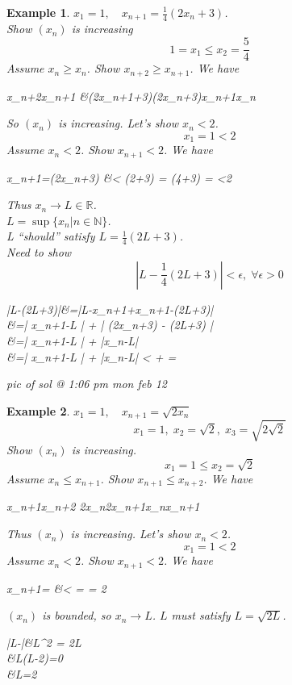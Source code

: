 \documentclass{report}
\newcommand{\N}{\mathbb{N}}  %
\newcommand{\R}{\mathbb{R}}  %
\theoremstyle{mystyle}
\newtheorem*{example}{Example}
\theoremstyle{customtheorem}
\newcommand{\ex}[1]{    \begin{example}{#1}\end{example}             }
\begin{document}
    \ex{
        $x_1=1,\quad x_{n+1}=(2x_n+3)$.\\
        Show $(x_n)$ is increasing
        \[1=x_1\leq x_2=\frac{5}{4}\]
        Assume $x_n \geq x_n$. Show $x_{n+2}\geq x_{n+1}$. We have
        \begin{flalign*}
            x_{n+2}\geq x_{n+1} &\iff \frac{1}{4}(2x_{n+1}+3)\geq \frac{1}{4}(2x_n+3)\iff x_{n+1}\geq x_n
        \end{flalign*}
        So $(x_n)$ is increasing. Let's show $x_n<2$.
        \[x_1=1<2\]
        Assume $x_n<2$. Show $x_{n+1}<2$. We have
        \begin{flalign*}
            x_{n+1}=\frac{1}{4}(2x_n+3) &< \frac{1}{4}(2\cdot 2+3) = \frac{1}{4}(4+3) = \frac{7}{4} <2
        \end{flalign*}
        Thus $x_n\rightarrow L\in \R$. \\
        $L=\sup\{x_n\vert n\in\N\}$. \\
        L ``should'' satisfy $L=\frac{1}{4}(2L+3)$.\\
        Need to show \[\left| L - \frac{1}{4}(2L+3)\right| < \epsilon,\; \forall \epsilon > 0\]
        \begin{flalign*}
            \left|L-\frac{1}{4}(2L+3)\right|&=\left|L-x_{n+1}+x_{n+1}-\frac{1}{4}(2L+3)\right|\\
            &=\left| x_{n+1}-L \right| + \left| \frac{1}{4}(2x_n+3) - \frac{1}{4}(2L+3) \right|\\
            &=\left| x_{n+1}-L \right| + \frac{1}{2}\left|x_n-L\right|\\
            &=\left| x_{n+1}-L \right| + \left|x_n-L\right| < \frac{\epsilon}{2} + \frac{\epsilon}{2} = \epsilon
        \end{flalign*}
        pic of sol @ 1:06 pm mon feb 12
    }

    \ex{
        $x_1=1, \quad x_{n+1}=$
        \[x_1=1,\; x_2=\sqrt{2},\; x_3=\sqrt{2\sqrt{2}}\]
        Show $(x_n)$ is increasing.
        \[x_1=1\leq x_2=\sqrt{2}\]
        Assume $x_n\leq x_{n+1}$. Show $x_{n+1}\leq x_{n+2}$. We have
        \begin{flalign*}
            x_{n+1}\leq x_{n+2} \iff \sqrt{2x_n}\leq \sqrt{2x_{n+1}}\iff 2x_n\leq 2x_{n+1}\iff x_n\leq x_{n+1}
        \end{flalign*}
        Thus $(x_n)$ is increasing. Let's show $x_n<2$.
        \[x_1=1<2\]
        Assume $x_n<2$. Show $x_{n+1}<2$. We have
        \begin{flalign*}
            x_{n+1}=\sqrt{2x_n} &< \sqrt{2\cdot 2} = \sqrt{4} = 2
        \end{flalign*}
        $(x_n)$ is bounded, so $x_n\rightarrow L$.
        $L$ must satisfy $L=\sqrt{2L}$.
        \begin{flalign*}
            \left|L-\sqrt{2L}\right|&\implies L^2 = 2L\\
            &\implies L(L-2)=0 \\
            &\implies L=2
        \end{flalign*}
    }
\end{document}
